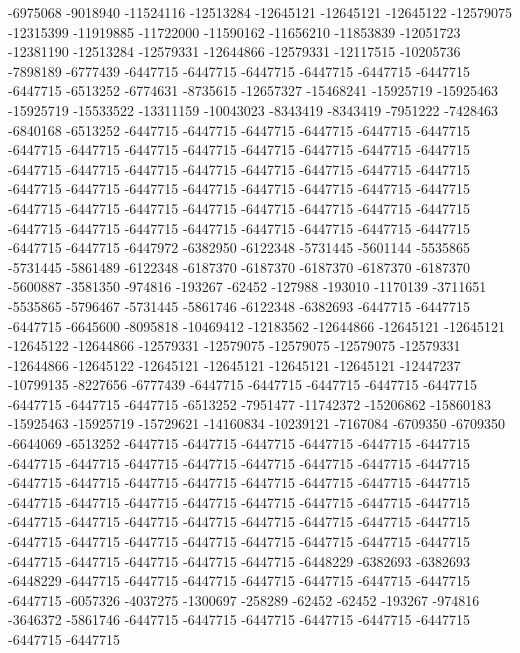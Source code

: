 -6975068 -9018940 -11524116 -12513284 -12645121 -12645121 -12645122 -12579075 -12315399 -11919885 -11722000 -11590162 -11656210 -11853839 -12051723 -12381190 -12513284 -12579331 -12644866 -12579331 -12117515 -10205736 -7898189 -6777439 -6447715 -6447715 -6447715 -6447715 -6447715 -6447715 -6447715 -6513252 -6774631 -8735615 -12657327 -15468241 -15925719 -15925463 -15925719 -15533522 -13311159 -10043023 -8343419 -8343419 -7951222 -7428463 -6840168 -6513252 -6447715 -6447715 -6447715 -6447715 -6447715 -6447715 -6447715 -6447715 -6447715 -6447715 -6447715 -6447715 -6447715 -6447715 -6447715 -6447715 -6447715 -6447715 -6447715 -6447715 -6447715 -6447715 -6447715 -6447715 -6447715 -6447715 -6447715 -6447715 -6447715 -6447715 -6447715 -6447715 -6447715 -6447715 -6447715 -6447715 -6447715 -6447715 -6447715 -6447715 -6447715 -6447715 -6447715 -6447715 -6447715 -6447715 -6447715 -6447715 -6447972 -6382950 -6122348 -5731445 -5601144 -5535865 -5731445 -5861489 -6122348 -6187370 -6187370 -6187370 -6187370 -6187370 -5600887 -3581350 -974816 -193267 -62452 -127988 -193010 -1170139 -3711651 -5535865 -5796467 -5731445 -5861746 -6122348 -6382693 -6447715 -6447715 -6447715
-6645600 -8095818 -10469412 -12183562 -12644866 -12645121 -12645121 -12645122 -12644866 -12579331 -12579075 -12579075 -12579075 -12579331 -12644866 -12645122 -12645121 -12645121 -12645121 -12645121 -12447237 -10799135 -8227656 -6777439 -6447715 -6447715 -6447715 -6447715 -6447715 -6447715 -6447715 -6447715 -6513252 -7951477 -11742372 -15206862 -15860183 -15925463 -15925719 -15729621 -14160834 -10239121 -7167084 -6709350 -6709350 -6644069 -6513252 -6447715 -6447715 -6447715 -6447715 -6447715 -6447715 -6447715 -6447715 -6447715 -6447715 -6447715 -6447715 -6447715 -6447715 -6447715 -6447715 -6447715 -6447715 -6447715 -6447715 -6447715 -6447715 -6447715 -6447715 -6447715 -6447715 -6447715 -6447715 -6447715 -6447715 -6447715 -6447715 -6447715 -6447715 -6447715 -6447715 -6447715 -6447715 -6447715 -6447715 -6447715 -6447715 -6447715 -6447715 -6447715 -6447715 -6447715 -6447715 -6447715 -6447715 -6447715 -6448229 -6382693 -6382693 -6448229 -6447715 -6447715 -6447715 -6447715 -6447715 -6447715 -6447715 -6447715 -6057326 -4037275 -1300697 -258289 -62452 -62452 -193267 -974816 -3646372 -5861746 -6447715 -6447715 -6447715 -6447715 -6447715 -6447715 -6447715 -6447715
